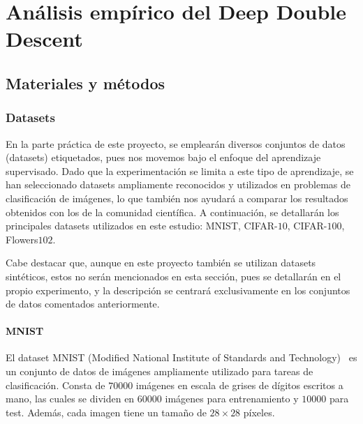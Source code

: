 
\chapter{Análisis empírico del Deep Double Descent}\label{ch:analisis-empirico-ddd}

\section{Materiales y métodos}\label{sec:materiales-y-metodos}

\subsection{Datasets}\label{subsec:datasets}

En la parte práctica de este proyecto, se emplearán diversos conjuntos de datos (datasets) etiquetados, pues nos movemos bajo el enfoque del aprendizaje supervisado. Dado que la experimentación se limita a este tipo de aprendizaje, se han seleccionado datasets ampliamente reconocidos y utilizados en problemas de clasificación de imágenes, lo que también nos ayudará a comparar los resultados obtenidos con los de la comunidad científica. A continuación, se detallarán los principales datasets utilizados en este estudio: MNIST, CIFAR-$10$, CIFAR-$100$, Flowers$102$.\newline


Cabe destacar que, aunque en este proyecto también se utilizan datasets sintéticos, estos no serán mencionados en esta sección, pues se detallarán en el propio experimento, y la descripción se centrará exclusivamente en los conjuntos de datos comentados anteriormente.\newline

\subsubsection{MNIST}\label{subsubsec:MNIST}

El dataset MNIST (Modified National Institute of Standards and Technology)~\cite{LeCun2005TheMD} es un conjunto de datos de imágenes ampliamente utilizado para tareas de clasificación. Consta de $70000$ imágenes en escala de grises de dígitos escritos a mano, las cuales se dividen en $60000$ imágenes para entrenamiento y $10000$ para test. Además, cada imagen tiene un tamaño de $28 \times 28$ píxeles.\newline

